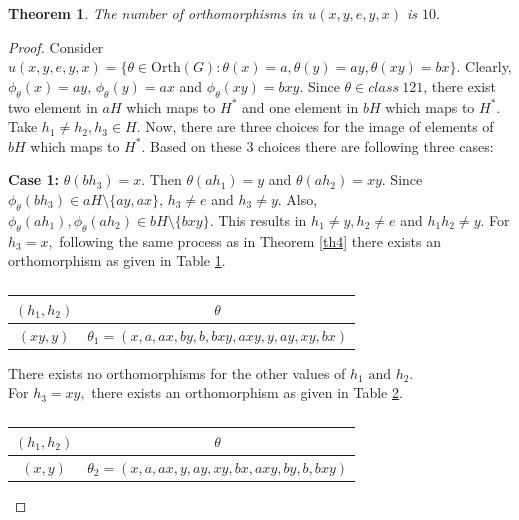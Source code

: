 \documentclass[11pt,a4paper]{article}
\newtheorem{theorem}{Theorem}[section]
\theoremstyle{definition}
\theoremstyle{remark}
\begin{document}
\begin{theorem}\label{th5}
    The number of orthomorphisms in $u(x,y,e,y,x)$ is $10.$
\end{theorem}
\begin{proof}
	  Consider $u(x,y,e,y,x) = \{\theta \in \text{Orth}(G) : \theta(x) = a, \theta(y) = ay, \theta(xy) = bx\}$.  Clearly, $\phi_{\theta}(x) =ay$, $\phi_{\theta}(y) = ax$ and $\phi_{\theta}(xy) = bxy$. Since $\theta \in class~121$, there exist two element in $aH$ which maps to  $H^{\ast}$ and one element in $bH$ which maps to $H^{\ast}$.  Take $h_{1} \neq h_{2}, h_{3} \in H$.  Now, there are three choices for the image of elements of $bH$ which maps to $H^{\ast}$. Based on these $3$ choices there are following three cases:   
	
	\textbf{Case 1:}   $\theta(bh_{3}) = x.$ Then $\theta(ah_{1}) = y$ and $\theta(ah_{2}) = xy$.  Since $\phi_{\theta}(bh_{3}) \in aH \setminus \{ay,ax\}$,  $h_{3} \neq e$ and $h_{3} \neq y$. Also, $\phi_{\theta}(ah_{1}), \phi_{\theta}(ah_{2}) \in bH\setminus\{bxy\}.$ This results in $h_{1} \neq y, h_{2} \neq e$ and $h_{1}h_{2} \neq y$. For $h_{3} = x,$ following the same process as in Theorem \ref{th4} there exists an orthomorphism as given in Table \ref{t9}.
	\begin{table}[H]
		\begin{center}
			\begin{tabular}{|c|c|}
			\hline
			$(h_{1},h_{2})$ & $\theta$\\ \hline
			$(xy,y)$ &  $\theta_{1} = (x,a,ax,by,b,bxy,axy,y,ay,xy,bx)$ \\ \hline
		\end{tabular}\caption{} \label{t9}
		\end{center}
	\end{table}
	\vspace{-.7cm}
		There exists no orthomorphisms for the other values of $h_{1} \text{ and } h_{2}$.\\
	For $h_{3} = xy,$ there exists an orthomorphism as given in Table \ref{t10}.
	\begin{table}[H]
	\begin{center}
			\begin{tabular}{|c|c|}
			\hline
			$(h_{1},h_{2})$ & $\theta$\\ \hline
			$(x,y)$ &  $\theta_{2} = (x,a,ax,y,ay,xy,bx,axy,by,b,bxy)$ \\ \hline
		\end{tabular} \caption{} \label{t10}
	\end{center}

\end{table}
\end{proof}
\end{document}
